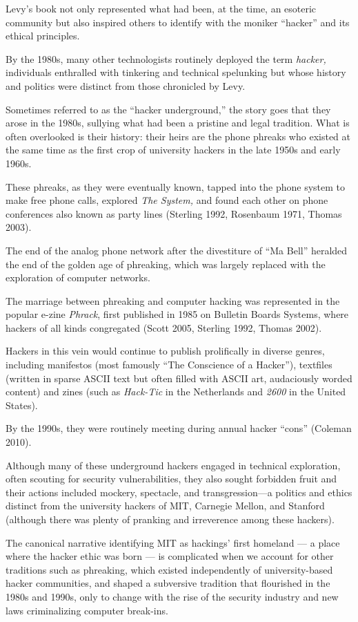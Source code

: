 \documentclass[letterpaper,12pt,english]{sphinxmanual}
\begin{document}
Levy’s
book
not
only
represented
what
had
been,
at
the
time,
an
esoteric
community but
also
inspired
others
to
identify
with
the
moniker
“hacker”
and
its
ethical
principles.

By
the
1980s,
many
other
technologists
routinely deployed
the
term
\emph{hacker,}
individuals
enthralled
with
tinkering
and
technical spelunking
but
whose
history
and
politics
were distinct
from those chronicled by Levy.

Sometimes
referred
to
as
the
“hacker underground,”
the story goes that they arose in the 1980s, sullying what had been a pristine and legal tradition. What is often overlooked is
their history: their heirs
are the
phone
phreaks
who
existed at the same time as the
first crop of university hackers
in
the
late
1950s
and
early
1960s.

These phreaks, as they were
eventually known,
tapped
into
the
phone
system
to
make
free
phone
calls,
explored \emph{The System,} and
found
each
other
on
phone
conferences
also
known
as
party
lines
(Sterling
1992, Rosenbaum 1971, Thomas
2003).

The
end
of
the
analog
phone
network
after the divestiture of “Ma Bell”
heralded
the
end
of
the
golden
age
of
phreaking, which was largely
replaced
with
the
exploration
of
computer
networks.

The marriage
between phreaking
and computer hacking
was
represented
in
the
popular
e-zine
\emph{Phrack},
first
published
in
1985
on
Bulletin
Boards
Systems,
where
hackers
of
all
kinds
congregated
(Scott
2005,
Sterling
1992,
Thomas
2002).

Hackers
in this vein
would
continue
to
publish
prolifically
in diverse
genres,
including
manifestos
(most famously “The
Conscience
of
a
Hacker”),
textfiles
(written
in
sparse
ASCII
text
but
often
filled
with
ASCII art,
audaciously
worded
content)
and
zines
(such as \emph{Hack-Tic} in
the
Netherlands
and
\emph{2600}
in
the
United
States).

By the
1990s, they
were
routinely
meeting
during
annual
hacker
“cons”
(Coleman
2010).

Although
many
of
these
underground
hackers
engaged
in
technical
exploration,
often scouting for
security
vulnerabilities,
they
also
sought
forbidden
fruit and their
actions
included
mockery,
spectacle,
and
transgression—a
politics
and
ethics
distinct
from
the
university
hackers
of
MIT,
Carnegie
Mellon,
and
Stanford
(although
there
was
plenty
of
pranking
and irreverence
among
these
hackers).

The canonical narrative identifying MIT as hackings’ first homeland — a place where the hacker ethic was born — is complicated when we account for other traditions such as phreaking, which existed independently of university-based hacker communities, and shaped a subversive tradition that flourished in the 1980s and 1990s, only to change with the rise of the security industry and new laws criminalizing computer break-ins.
\end{document}
